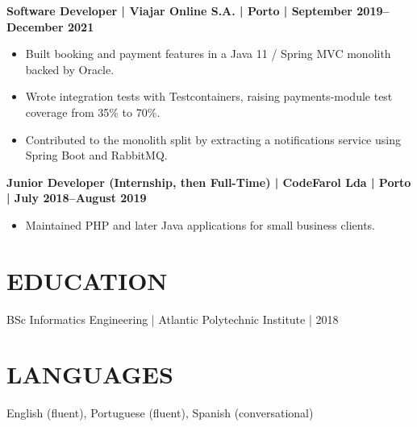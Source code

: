\documentclass[11pt,a4paper]{article}
\begin{document}
\textbf{Software Developer | Viajar Online S.A. | Porto | September 2019–December 2021}
\begin{itemize}
\item Built booking and payment features in a Java 11 / Spring MVC monolith backed by Oracle.
\item Wrote integration tests with Testcontainers, raising payments-module test coverage from 35\% to 70\%.
\item Contributed to the monolith split by extracting a notifications service using Spring Boot and RabbitMQ.
\end{itemize}

\textbf{Junior Developer (Internship, then Full-Time) | CodeFarol Lda | Porto | July 2018–August 2019}
\begin{itemize}
\item Maintained PHP and later Java applications for small business clients.
\end{itemize}

\section*{EDUCATION}
BSc Informatics Engineering | Atlantic Polytechnic Institute | 2018

\section*{LANGUAGES}
English (fluent), Portuguese (fluent), Spanish (conversational)
\end{document}
